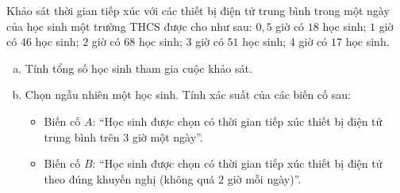 \begin{bt}%
	Khảo sát thời gian tiếp xúc với các thiết bị điện tử trung bình trong một ngày của học sinh một trường THCS được cho như sau: $0{,}5$ giờ có $18$ học sinh; $1$ giờ có $46$ học sinh; $2$ giờ có $68$ học sinh; $3$ giờ có $51$ học sinh; $4$ giờ có $17$ học sinh.
	\begin{enumerate}[a)]
		\item Tính tổng số học sinh tham gia cuộc khảo sát.
		\item Chọn ngẫu nhiên một học sinh. Tính xác suất của các biến cố sau:
		\begin{itemize}
			\item Biến cố $A$: ``Học sinh được chọn có thời gian tiếp xúc thiết bị điện tử trung bình trên $3$ giờ một ngày''.
			\item Biến cố $B$: ``Học sinh được chọn có thời gian tiếp xúc thiết bị điện tử theo đúng khuyến nghị (không quá $2$ giờ mỗi ngày)''.
		\end{itemize}
	\end{enumerate}
\end{bt}

